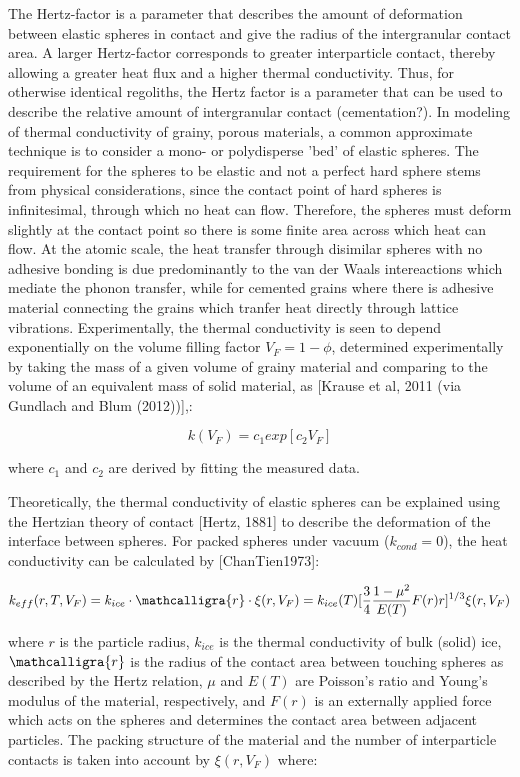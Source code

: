 \documentclass[11pt]{article} %
\newcommand{\vf}{\ensuremath{V_{F}}\xspace}
\newcommand{\sr}{\ensuremath{\mathcalligra{r}} \xspace}
\begin{document}
	The Hertz-factor is a parameter that describes the amount of deformation between elastic spheres in contact and give the radius of the intergranular contact area. A larger Hertz-factor corresponds to greater interparticle contact, thereby allowing a greater heat flux and a higher thermal conductivity. Thus, for otherwise identical regoliths, the Hertz factor is a parameter that can be used to describe the relative amount of intergranular contact (cementation?). In modeling of thermal conductivity of grainy, porous materials, a common approximate technique is to consider a mono- or polydisperse 'bed' of elastic spheres. The requirement for the spheres to be elastic and not a perfect hard sphere stems from physical considerations, since the contact point of hard spheres is infinitesimal, through which no heat can flow. Therefore, the spheres must deform slightly at the contact point so there is some finite area across which heat can flow. At the atomic scale, the heat transfer through disimilar spheres with no adhesive bonding is due predominantly to the van der Waals intereactions which mediate the phonon transfer, while for cemented grains where there is adhesive material connecting the grains which tranfer heat directly through lattice vibrations. 
	Experimentally, the thermal conductivity is seen to depend exponentially on the volume filling factor $\vf = 1- \phi$, determined experimentally by taking the mass of a given volume of grainy material and comparing to the volume of an equivalent mass of solid material, as [Krause et al, 2011 (via Gundlach and Blum (2012))],:
	
	\begin{equation}
	k(\vf) = c_{1} exp [c_{2} \vf]
	\end{equation}

	where $c_{1}$ and $c_{2}$ are derived by fitting the measured data.
	
	Theoretically, the thermal conductivity of elastic spheres can be explained using the Hertzian theory of contact [Hertz, 1881] to describe the deformation of the interface between spheres. For packed spheres under vacuum ($k_{cond} = 0$), the heat conductivity can be calculated by [ChanTien1973]:
	
	\begin{equation}
	k_{eff}(r, T, \vf) = k_{ice}\cdot \sr \cdot \xi(r, \vf)= k_{ice}(T) [\frac{3}{4} \frac{1 - \mu^{2}}{E(T)} F(r) r]^{1/3} \xi(r, \vf)
	\end{equation}
	
	 where $r$ is the particle radius, $k_{ice}$ is the thermal conductivity of bulk (solid) ice, $\sr$ is the radius of the contact area between touching spheres as described by the Hertz relation, $\mu$ and $E(T)$ are Poisson's ratio and Young's modulus of the material, respectively, and $F(r)$ is an externally applied force which acts on the spheres and determines the contact area between adjacent particles. The packing structure of the material and the number of interparticle contacts is taken into account by $\xi(r, \vf)$ where:
	
\end{document}
